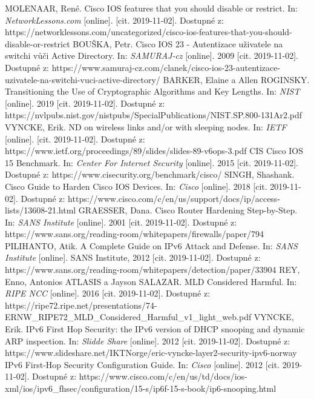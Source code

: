 \begin{literatura}{99}
MOLENAAR, René. Cisco IOS features that you should disable or restrict. In: \textit{NetworkLessons.com} [online]. [cit. 2019-11-02]. Dostupné z: https://networklessons.com/uncategorized/cisco-ios-features-that-you-should-disable-or-restrict
BOUŠKA, Petr. Cisco IOS 23 - Autentizace uživatele na switchi vůči Active Directory. In: \textit{SAMURAJ-cz} [online]. 2009 [cit. 2019-11-02]. Dostupné z: https://www.samuraj-cz.com/clanek/cisco-ios-23-autentizace-uzivatele-na-switchi-vuci-active-directory/
BARKER, Elaine a Allen ROGINSKY. Transitioning the Use of Cryptographic Algorithms and Key Lengths. In: \textit{NIST} [online]. 2019 [cit. 2019-11-02]. Dostupné z: https://nvlpubs.nist.gov/nistpubs/SpecialPublications/NIST.SP.800-131Ar2.pdf
VYNCKE, Erik. ND on wireless links and/or with sleeping nodes. In: \textit{IETF} [online]. [cit. 2019-11-02]. Dostupné z: https://www.ietf.org/proceedings/89/slides/slides-89-v6ops-3.pdf
CIS Cisco IOS 15 Benchmark. In: \textit{Center For Internet Security} [online]. 2015 [cit. 2019-11-02]. Dostupné z: https://www.cisecurity.org/benchmark/cisco/
SINGH, Shashank. Cisco Guide to Harden Cisco IOS Devices. In: \textit{Cisco} [online]. 2018 [cit. 2019-11-02]. Dostupné z: https://www.cisco.com/c/en/us/support/docs/ip/access-lists/13608-21.html
GRAESSER, Dana. Cisco Router Hardening Step-by-Step. In: \textit{SANS Institute} [online]. 2001 [cit. 2019-11-02]. Dostupné z: https://www.sans.org/reading-room/whitepapers/firewalls/paper/794
PILIHANTO, Atik. A Complete Guide on IPv6 Attack and Defense. In: \textit{SANS Institute} [online]. SANS Institute, 2012 [cit. 2019-11-02]. Dostupné z: https://www.sans.org/reading-room/whitepapers/detection/paper/33904
REY, Enno, Antonios ATLASIS a Jayson SALAZAR. MLD Considered Harmful. In: \textit{RIPE NCC} [online]. 2016 [cit. 2019-11-02]. Dostupné z: https://ripe72.ripe.net/presentations/74-ERNW\_RIPE72\_MLD\_Considered\_Harmful\_v1\_light\_web.pdf
VYNCKE, Erik. IPv6 First Hop Security: the IPv6 version of DHCP snooping and dynamic ARP inspection. In: \textit{Slidde Share} [online]. 2012 [cit. 2019-11-02]. Dostupné z: https://www.slideshare.net/IKTNorge/eric-vyncke-layer2-security-ipv6-norway
IPv6 First-Hop Security Configuration Guide. In: \textit{Cisco} [online]. 2012 [cit. 2019-11-02]. Dostupné z: https://www.cisco.com/c/en/us/td/docs/ios-xml/ios/ipv6\_fhsec/configuration/15-s/ip6f-15-s-book/ip6-snooping.html

\end{literatura}
